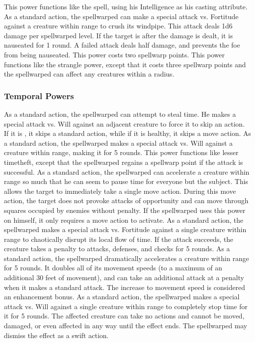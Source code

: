  This power functions like the  spell, using his Intelligence as his casting attribute.
 As a standard action, the spellwarped can make a special attack vs. Fortitude against a creature within \rngclose range to crush its windpipe. This attack deals 1d6 damage per spellwarped level. If the target is \bloodied after the damage is dealt, it is nauseated for 1 round. A failed attack deals half damage, and prevents the foe from being nauseated. This power costs two spellwarp points.
 This power functions like the strangle power, except that it costs three spellwarp points and the spellwarped can affect any creatures within a \areasmall radius.

\subsubsection{Temporal Powers}
 As a standard action, the spellwarped can attempt to steal time. He makes a special attack vs. Will against an adjacent creature to force it to skip an action. If it is \bloodied, it skips a standard action, while if it is healthy, it skips a move action.
 As a standard action, the spellwarped makes a special attack vs. Will against a creature within \rngclose range, making it \slowed for 5 rounds.
 This power functions like lesser timetheft, except that the spellwarped regains a spellwarp point if the attack is successful.
 As a standard action, the spellwarped can accelerate a creature within \rngclose range so much that he can seem to pause time for everyone but the subject. This allows the target to immediately take a single move action. During this move action, the target does not provoke attacks of opportunity and can move through squares occupied by enemies without penalty. If the spellwarped uses this power on himself, it only requires a move action to activate.
 As a standard action, the spellwarped makes a special attack vs. Fortitude against a single creature within \rngmed range to chaotically disrupt its local flow of time. If the attack succeeds, the creature takes a  penalty to attacks, defenses, and checks for 5 rounds.
 As a standard action, the spellwarped dramatically accelerates a creature within \rngclose range for 5 rounds. It doubles all of its movement speeds (to a maximum of an additional 30 feet of movement), and can take an additional attack at a  penalty when it makes a standard attack. The increase to movement speed is considered an enhancement bonus.
 As a standard action, the spellwarped makes a special attack vs. Will against a single creature within \rngclose range to completely stop time for it for 5 rounds. The affected creature can take no actions and cannot be moved, damaged, or even affected in any way until the effect ends. The spellwarped may dismiss the effect as a swift action.

